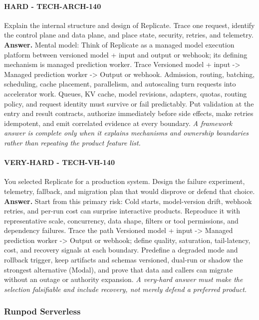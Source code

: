 \paragraph{HARD - TECH-ARCH-140} Explain the internal structure and design of Replicate. Trace one request, identify the control plane and data plane, and place state, security, retries, and telemetry.
\textbf{Answer.} Mental model: Think of Replicate as a managed model execution platform between versioned model + input and output or webhook; its defining mechanism is managed prediction worker. Trace Versioned model + input -> Managed prediction worker -> Output or webhook. Admission, routing, batching, scheduling, cache placement, parallelism, and autoscaling turn requests into accelerator work. Queues, KV cache, model revisions, adapters, quotas, routing policy, and request identity must survive or fail predictably. Put validation at the entry and result contracts, authorize immediately before side effects, make retries idempotent, and emit correlated evidence at every boundary.
\textit{A framework answer is complete only when it explains mechanisms and ownership boundaries rather than repeating the product feature list.}
\paragraph{VERY-HARD - TECH-VH-140} You selected Replicate for a production system. Design the failure experiment, telemetry, fallback, and migration plan that would disprove or defend that choice.
\textbf{Answer.} Start from this primary risk: Cold starts, model-version drift, webhook retries, and per-run cost can surprise interactive products. Reproduce it with representative scale, concurrency, data shape, filters or tool permissions, and dependency failures. Trace the path Versioned model + input -> Managed prediction worker -> Output or webhook; define quality, saturation, tail-latency, cost, and recovery signals at each boundary. Predefine a degraded mode and rollback trigger, keep artifacts and schemas versioned, dual-run or shadow the strongest alternative (Modal), and prove that data and callers can migrate without an outage or authority expansion.
\textit{A very-hard answer must make the selection falsifiable and include recovery, not merely defend a preferred product.}
\subsubsection*{Runpod Serverless}

